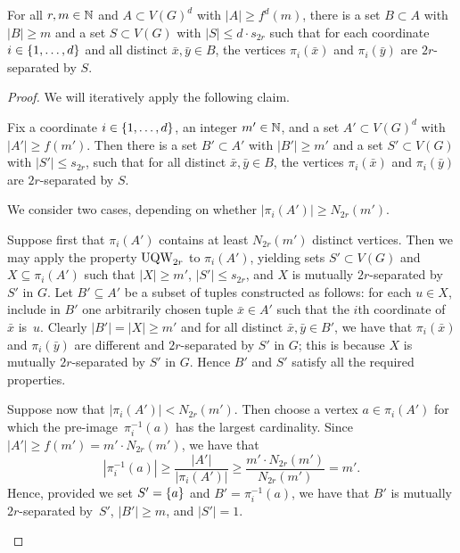 \begin{lemma}\label{lem:step1} 
  For all $r,m\in \mathbb{N}$ and $A\subset V(G)^d$ with $|A|\ge f^d(m)$,
  there is a set $B\subset A$ with $|B|\ge m$ and a set
  $S\subset V(G)$ with $|S|\le d\cdot s_{2r}$ such that for each
  coordinate $i\in\{1,\ldots,d\}$ and all distinct
  $\bar x,\bar y\in B$, the vertices $\pi_i(\bar x)$ and
  $\pi_i(\bar y)$ are $2r$-separated by $S$.
\end{lemma}
\begin{proof}
We will iteratively apply the following claim.


\begin{claim}\label{claim:ith-coord}
  Fix a coordinate $i\in\{1,\ldots,d\}$, an integer $m'\in\mathbb{N}$, and a
  set $A'\subset V(G)^d$ with $|A'|\ge f(m')$.  Then there is a set
  $B'\subset A'$ with $|B'|\ge m'$ and a set $S'\subset V(G)$ with
  $|S'|\le s_{2r}$, such that for all distinct $\bar x,\bar y\in B$,
  the vertices $\pi_i(\bar x)$ and $\pi_i(\bar y)$ are $2r$-separated
  by $S$.
\end{claim}
\begin{clproof}
  We consider two cases, depending on whether
  $|\pi_i(A')|\geq N_{2r}(m')$.

  Suppose first that $\pi_i(A')$ contains at least $N_{2r}(m')$
  distinct vertices.  Then we may apply the property $\mathrm{UQW}_{2r}$ to
  $\pi_i(A')$, yielding sets $S'\subset V(G)$ and
  $X\subseteq \pi_i(A')$ such that $|X|\ge m'$, $|S'|\le s_{2r}$, and
  $X$ is mutually $2r$-separated by $S'$ in $G$.  Let $B'\subseteq A'$
  be a subset of tuples constructed as follows: for each $u\in X$,
  include in $B'$ one arbitrarily chosen tuple $\bar x\in A'$ such
  that the $i$th coordinate of $\bar x$ is~$u$.  Clearly
  $|B'|=|X|\ge m'$ and for all distinct $\bar x,\bar y\in B'$, we have
  that $\pi_i(\bar x)$ and $\pi_i(\bar y)$ are different and
  $2r$-separated by $S'$ in $G$; this is because $X$ is mutually
  $2r$-separated by $S'$ in $G$. Hence $B'$ and $S'$ satisfy all the
  required properties.

  Suppose now that $|\pi_i(A')|<N_{2r}(m')$.  Then choose a vertex
  $a\in \pi_i(A')$ for which the pre-image~$\pi_i^{-1}(a)$ has the
  largest cardinality.  Since $|A'|\geq f(m')=m'\cdot N_{2r}(m')$, we
  have that
$$|\pi_i^{-1}(a)|\geq \frac{|A'|}{|\pi_i(A')|}\geq \frac{m'\cdot N_{2r}(m')}{N_{2r}(m')}=m'.$$
Hence, provided we set $S'=\{a\}$ and $B'=\pi_i^{-1}(a)$, we have
that $B'$ is mutually $2r$-separated by~$S'$, $|B'|\geq m$, and
$|S'|=1$.
\end{clproof}


\end{proof}
